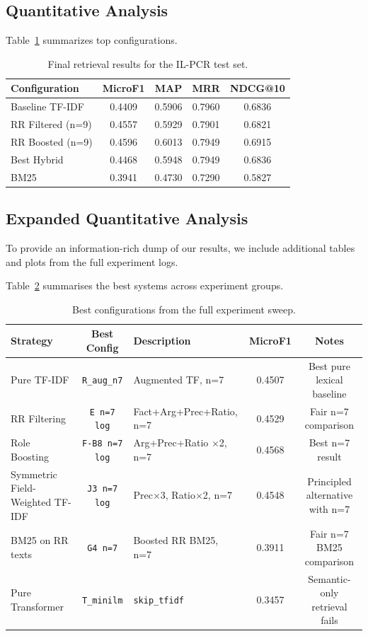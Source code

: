 \documentclass[11pt]{article}
\begin{document}
\subsection{Quantitative Analysis}
Table~\ref{tab:final_results} summarizes top configurations.

\begin{table}[h]
    \centering
    \footnotesize
    \setlength{\tabcolsep}{5pt}
    \begin{tabular}{lcccc}
        \toprule
        Configuration & MicroF1 & MAP & MRR & NDCG@10 \\
        \midrule
        Baseline TF-IDF & 0.4409 & 0.5906 & 0.7960 & 0.6836 \\
        RR Filtered (n=9) & 0.4557 & 0.5929 & 0.7901 & 0.6821 \\
        RR Boosted (n=9) & 0.4596 & 0.6013 & 0.7949 & 0.6915 \\
        Best Hybrid & 0.4468 & 0.5948 & 0.7949 & 0.6836 \\
        BM25 & 0.3941 & 0.4730 & 0.7290 & 0.5827 \\
        \bottomrule
    \end{tabular}
    \caption{Final retrieval results for the IL-PCR test set.}
    \label{tab:final_results}
\end{table}

\subsection{Expanded Quantitative Analysis}
To provide an information-rich dump of our results, we include additional tables and plots from the full experiment logs.

Table~\ref{tab:top_experiments} summarises the best systems across experiment groups.

\begin{table}[htbp]
\centering
\footnotesize
\setlength{\tabcolsep}{5pt}
\begin{tabular}{@{}lclcc@{}}
\toprule
\textbf{Strategy} & \textbf{Best Config} & \textbf{Description} & \textbf{MicroF1} & \textbf{Notes} \\
\midrule
Pure TF-IDF & \texttt{R\_aug\_n7} & Augmented TF, n=7 & 0.4507 & Best pure lexical baseline \\
RR Filtering & \texttt{E n=7 log} & Fact+Arg+Prec+Ratio, n=7 & 0.4529 & Fair n=7 comparison \\
Role Boosting & \texttt{F-B8 n=7 log} & Arg+Prec+Ratio ×2, n=7 & 0.4568 & Best n=7 result \\
Symmetric Field-Weighted TF-IDF & \texttt{J3 n=7 log} & Prec×3, Ratio×2, n=7 & 0.4548 & Principled alternative with n=7 \\
BM25 on RR texts & \texttt{G4 n=7} & Boosted RR BM25, n=7 & 0.3911 & Fair n=7 BM25 comparison \\
Pure Transformer & \texttt{T\_minilm} & \texttt{skip\_tfidf} & 0.3457 & Semantic-only retrieval fails \\
\bottomrule
\end{tabular}
\caption{Best configurations from the full experiment sweep.}
\label{tab:top_experiments}
\end{table}
\end{document}
